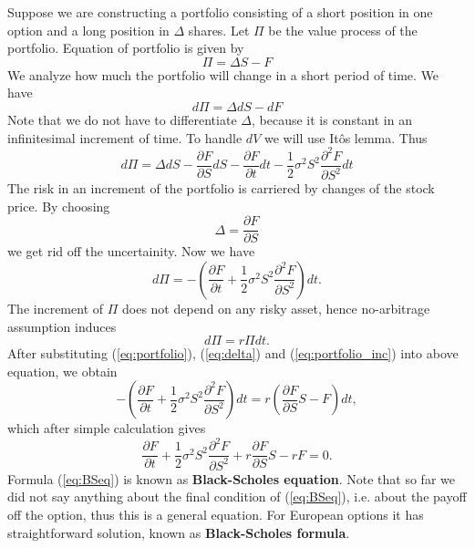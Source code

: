 \documentclass[a4paper,11pt, twoside]{book}
\theoremstyle{definition}
\theoremstyle{remark}
\begin{document}
Suppose we are constructing a portfolio consisting of a short position in one option and a long position in $\Delta$ shares. Let $\Pi$ be the value process of the portfolio. Equation of portfolio is given by
\begin{equation}
 \label{eq:portfolio}
  \Pi = \Delta S - F 
\end{equation}
We analyze how much the portfolio will change in a short period of time. We have
\[ d\Pi = \Delta dS - dF  \]
Note that we do not have to differentiate $\Delta$, because it is constant in an infinitesimal increment of time. To handle $dV$ we will use It\^{o}s lemma. Thus
\[ d\Pi = \Delta dS - \frac{\partial F}{\partial S}dS - \frac{\partial F}{\partial t}dt - \frac{1}{2}\sigma^2 S^2 \frac{\partial^2 F}{\partial S^2}dt  \]
The risk in an increment of the portfolio is carriered by changes of the stock price. By choosing
\begin{equation}
 \label{eq:delta}
 \Delta = \frac{\partial F}{\partial S}
\end{equation}
we get rid off the uncertainity. Now we have
\begin{equation}
  \label{eq:portfolio_inc}
 d\Pi = -(\frac{\partial F}{\partial t} + \frac{1}{2}\sigma^2 S^2 \frac{\partial^2 F}{\partial S^2})dt.
\end{equation}
The increment of $\Pi$ does not depend on any risky asset, hence no-arbitrage assumption induces
\[ d\Pi = r\Pi dt. \]
After substituting (\ref{eq:portfolio}), (\ref{eq:delta}) and (\ref{eq:portfolio_inc}) into above equation, we obtain
\[ -(\frac{\partial F}{\partial t} + \frac{1}{2}\sigma^2 S^2 \frac{\partial^2 F}{\partial S^2})dt = r(\frac{\partial F}{\partial S} S - F)dt, \]
which after simple calculation gives
\begin{equation}
 \label{eq:BSeq}
 \frac{\partial F}{\partial t} + \frac{1}{2}\sigma^2 S^2 \frac{\partial^2 F}{\partial S^2} + r\frac{\partial F}{\partial S} S - rF = 0.
\end{equation}
Formula (\ref{eq:BSeq}) is known as \textbf{Black-Scholes equation}. Note that so far we did not say anything about the final condition of (\ref{eq:BSeq}), i.e. about the payoff off the option, thus this is a general equation. For European options it has straightforward solution, known as \textbf{Black-Scholes formula}.
\end{document}

